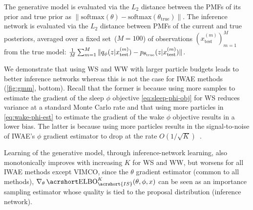 The generative model is evaluated via the $L_2$ distance between the \glspl{PMF} of its prior and true prior as $\|\mathrm{softmax}(\theta) - \mathrm{softmax}(\theta_\text{true})\|$.
The inference network is evaluated via the $L_2$ distance between \glspl{PMF} of the current and true posteriors, averaged over a fixed set~(\(M=100\)) of observations $(x_{\text{test}}^{(m)})_{m = 1}^{M}$ from the true model: $\frac{1}{M} \sum_{m = 1}^M \|q_\phi(z \lvert x_{\text{test}}^{(m)}) - p_{\theta_{\text{true}}}(z \lvert x_{\text{test}}^{(m)})\|$.

We demonstrate that using \gls{WS} and \gls{WW} with larger particle budgets leads to better inference networks whereas this is not the case for \gls{IWAE} methods (\cref{fig:gmm}, bottom).
Recall that the former is because using more samples to estimate the gradient of the sleep $\phi$ objective \cref{eq:sleep-phi-obj} for \gls{WS} reduces variance at a standard Monte Carlo rate and that using more particles in \cref{eq:wake-phi-est} to estimate the gradient of the wake $\phi$ objective results in a lower bias.
The latter is because using more particles results in the signal-to-noise of \gls{IWAE}'s $\phi$ gradient estimator to drop at the rate $O(1 / \sqrt{K})$~\citep{rainforth2018tighter}.

Learning of the generative model, through inference-network learning, also monotonically improves with increasing \(K\) for \gls{WS} and \gls{WW}, but worsens for all \gls{IWAE} methods except \gls{VIMCO}, since the $\theta$ gradient estimator (common to all methods), $\nabla_\theta \ELBO_{\acrshort{IS}}^K(\theta, \phi, x)$ can be seen as an importance sampling estimator whose quality is tied to the proposal distribution (inference network).

